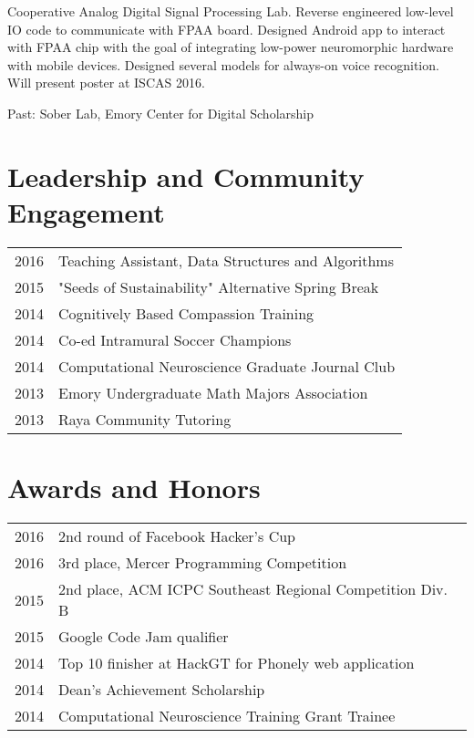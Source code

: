 \documentclass[letterpaper]{deedy-resume} %
\begin{document}
\begin{minipage}[t]{0.66\textwidth}

Cooperative Analog Digital Signal Processing Lab. Reverse engineered low-level IO code to communicate with FPAA board. Designed Android app to interact with FPAA chip with the goal of integrating low-power neuromorphic hardware with mobile devices. Designed several models for always-on voice recognition. Will present poster at ISCAS 2016.

\vspace{3mm}

Past: Sober Lab, Emory Center for Digital Scholarship

\sectionspace %


\section{Leadership and Community Engagement}

\sectionspace

\begin{tabular}{@{}ll}
	2016 & Teaching Assistant, Data Structures and Algorithms\\
	2015 & "Seeds of Sustainability" Alternative Spring Break\\
	2014 & Cognitively Based Compassion Training\\
	2014 & Co-ed Intramural Soccer Champions\\
	2014 & Computational Neuroscience Graduate Journal Club\\
	2013 & Emory Undergraduate Math Majors Association\\
	2013 & Raya Community Tutoring\\
\end{tabular}

\sectionspace %


\section{Awards and Honors} 

\begin{tabular}{@{}ll}
	2016 & 2nd round of Facebook Hacker's Cup\\
	2016 & 3rd place, Mercer Programming Competition\\
	2015 & 2nd place, ACM ICPC Southeast Regional Competition Div. B\\
	2015 & Google Code Jam qualifier\\
	2014 & Top 10 finisher at HackGT for Phonely web application\\
	2014 & Dean's Achievement Scholarship\\
	2014 & Computational Neuroscience Training Grant Trainee\\
\end{tabular}


\end{minipage}
\end{document}
